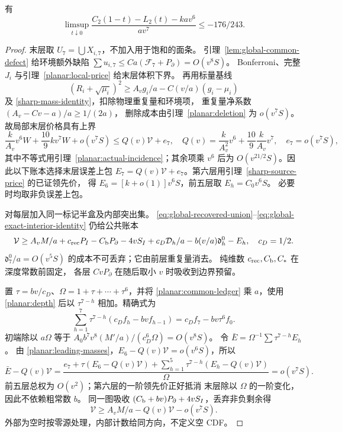 \begin{proposition}[二维七阶上界]\label{planar:upper}
有
\[
 \limsup_{t\downarrow0}
 \frac{C_2(1-t)-L_2(t)-kav^6}{av^7}\le-176/243.
\]
\end{proposition}
\begin{proof}
末层取 \(U_7=\bigcup X_{i,7}\)，不加入用于饱和的面条。
引理~\ref{lem:global-common-defect} 给环境额外缺陷
\(\sum u_{i,7}\le Ca(\mathcal F_7+P_\partial)=O(v^8S)\)。
Bonferroni、完整 \(J_i\) 与引理~\ref{planar:local-price} 给末层体积下界。
再用标量基线
\[
 (R_i+\sqrt{\mu_i})^2\ge A_vg_i/a-C(v/a)(g_i-\mu_i)
\]
及 \eqref{sharp-mass-identity}，扣除物理重复量和环境项，
重复量净系数 \((A_v-Cv-a)/a\ge1/(2a)\)，
删除成本由引理~\ref{planar:deletion} 为 \(o(v^7S)\)。
故局部末层价格具有上界
\[
 \frac{k}{A_v}v^6W+\frac{10}{9}kv^7W+o(v^7S)
     \le Q(v)\mathcal V+e_7,
 \quad Q(v)=\frac{k}{A_v^2}v^6+\frac{10}{9}\frac{k}{A_v}v^7,
 \quad e_7=o(v^7S),
\]
其中不等式用引理~\ref{planar:actual-incidence}；其余项乘 \(v^6\) 后为
\(O(v^{21/2}S)\)。因此以下账本选择末层误差上包
\(E_7=Q(v)\mathcal V+e_7\)。第六层用引理~\ref{sharp-source-price} 的已证领先价，
得 \(E_6=[k+o(1)]v^6S\)，前五层取 \(E_h=C_0v^6S\)。
必要时均取非负误差上包。

对每层加入同一标记半盒及内部突出集。
\eqref{eq:global-recovered-union}--\eqref{eq:global-exact-interior-identity}
仍给公共账本
\begin{equation}\label{planar:common-ledger}
 \mathcal V\ge A_vM/a+c_{\rm rec}P_I-C_{\rm b}P_\partial-4vS_I
       +c_D\mathcal D_h/a-b(v/a)\mathfrak d_h^0-E_h,
 \quad c_D=1/2.
\end{equation}
\(\mathfrak d_7^0/a=O(v^5S)\) 的成本不可丢弃；它由前层重复量消去。
纯维数 \(c_{\rm rec},C_{\rm b},C_*\) 在深度常数前固定，
各层 \(CvP_\partial\) 在随后取小 \(v\) 时吸收到边界预留。

置 \(\tau=bv/c_D\)、\(\Omega=1+\tau+\cdots+\tau^6\)，并将
\eqref{planar:common-ledger} 乘 \(a\)，使用 \eqref{planar:depth} 后以
\(\tau^{7-h}\) 相加。精确式为
\begin{equation}\label{planar:seven-telescope}
 \sum_{h=1}^7\tau^{7-h}(c_Df_h-bvf_{h-1})
       =c_Df_7-bv\tau^6f_0.
\end{equation}
初端除以 \(a\Omega\) 等于
\(A_0b^7v^8(M'/a)/(c_D^6\Omega)=O(v^8S)\)。
令 \(\bar E=\Omega^{-1}\sum\tau^{7-h}E_h\)。
由 \eqref{planar:leading-masses}，\(E_6-Q(v)\mathcal V=o(v^6S)\)，所以
\begin{equation}\label{planar:normalized-price}
 \bar E-Q(v)\mathcal V
 =\frac{e_7+\tau(E_6-Q(v)\mathcal V)
       +\sum_{h=1}^5\tau^{7-h}(E_h-Q(v)\mathcal V)}{\Omega}
 =o(v^7S).
\end{equation}
前五层总权为 \(O(v^2)\)；第六层的一阶领先价正好抵消
末层除以 \(\Omega\) 的一阶变化，因此不依赖粗常数 \(b\)。
同一图吸收 \((C_{\rm b}+bv)P_\partial+4vS_I\)，丢弃非负剩余得
\[
 \mathcal V\ge A_vM/a-Q(v)\mathcal V-o(v^7S).
\]
外部为空时按零源处理，内部计数给同方向，不定义空 CDF。


\end{proof}
